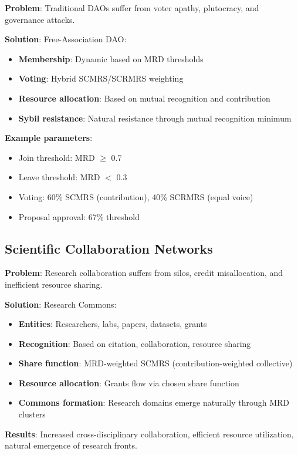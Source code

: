 \documentclass[11pt,a4paper]{article}
\theoremstyle{definition}
\theoremstyle{remark}
\begin{document}
\textbf{Problem}: Traditional DAOs suffer from voter apathy, plutocracy, and governance attacks.

\textbf{Solution}: Free-Association DAO:
\begin{itemize}
\item \textbf{Membership}: Dynamic based on MRD thresholds
\item \textbf{Voting}: Hybrid SCMRS/SCRMRS weighting
\item \textbf{Resource allocation}: Based on mutual recognition and contribution
\item \textbf{Sybil resistance}: Natural resistance through mutual recognition minimum
\end{itemize}

\textbf{Example parameters}:
\begin{itemize}
\item Join threshold: MRD $\ge$ 0.7
\item Leave threshold: MRD $<$ 0.3
\item Voting: 60\% SCMRS (contribution), 40\% SCRMRS (equal voice)
\item Proposal approval: 67\% threshold
\end{itemize}

\subsection{Scientific Collaboration Networks}

\textbf{Problem}: Research collaboration suffers from silos, credit misallocation, and inefficient resource sharing.

\textbf{Solution}: Research Commons:
\begin{itemize}
\item \textbf{Entities}: Researchers, labs, papers, datasets, grants
\item \textbf{Recognition}: Based on citation, collaboration, resource sharing
\item \textbf{Share function}: MRD-weighted SCMRS (contribution-weighted collective)
\item \textbf{Resource allocation}: Grants flow via chosen share function
\item \textbf{Commons formation}: Research domains emerge naturally through MRD clusters
\end{itemize}

\textbf{Results}: Increased cross-disciplinary collaboration, efficient resource utilization, natural emergence of research fronts.
\end{document}
